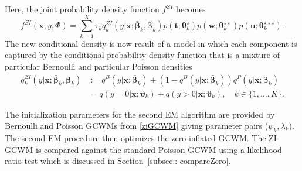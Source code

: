 \documentclass[12pt,letterpaper]{article}
\numberwithin{equation}{section}
\numberwithin{equation}{section}
\numberwithin{equation}{section}
\begin{document}
 
Here, the joint probability density function $f^{ZI}$ becomes
 $$f^{ZI}(\bm{x},y,\Phi) = \sum_{k=1}^{K} \tau_k q^{ZI}_{k}(y|\bm{x};  \bm{\bar{\beta}}_k,\bm{ \beta}_k)  p(\bm{t};\bm{\theta}_k^{\star})p(\bm{w};\bm{\theta}_k^{\star\star})p(\bm{u};\bm{\theta}_k^{\star\star\star}). $$  
 The new conditional density is now result of a model in which each component is captured by the conditional probability density function that is a mixture of particular Bernoulli and particular Poisson densities
\begin{align}
q^{ZI}_{k}(y|\bm{x};  \bm{\bar{\beta}}_k,\bm{ \beta}_k) & := q^B(y|\bm{x}; \bm{\bar{\beta}}_k) +(1-  q^B(y|\bm{x}; \bm{\bar{\beta}}_k) ) q^P(y|\bm{x};\bm{\beta}_k) \nonumber \\
& = q(y = 0|\bm{x};\bm{\vartheta}_{k} ) +  q(y > 0|\bm{x} ; \bm{\vartheta}_{k}), \quad k \in \{ 1, ..., K  \}.
\label{ziGCWM}
\end{align}

The initialization parameters for the second EM algorithm are provided by Bernoulli and Poisson GCWMs from \eqref{ziGCWM} giving parameter pairs ($ \psi_k,\lambda_k  $). The second EM procedure then optimizes the zero inflated GCWM. The ZI-GCWM is compared against the standard Poisson GCWM using a likelihood ratio test which is discussed in Section~\ref{subsec:: compareZero}.
\end{document}
